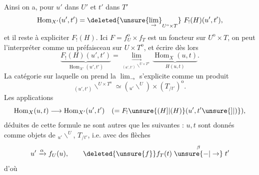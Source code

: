 Ainsi on a, pour $u'$ dans $U'$ et $t'$ dans $T'$
\[
\operatorname{Hom}_{X'}(u',t')=\deleted{\unsure{\lim_{\rightarrow}}_{U^{\mathrm o}\times T}}\ F_!(H)(u',t'),
\]
et il reste à expliciter $F_!(H)$. Ici 
$F=f_U^{\mathrm o}\times f_T$ est un foncteur  sur $U^{\mathrm o}\times T$,
on peut l'interpréter comme un préfaisceau sur
 $U\times T^{\mathrm o}$, et écrire dès lors
\[
\underbrace{F_!(H)(u',t')}_{\operatorname{Hom}_{X'}(u',t')}
=\underset{{}_{(u',t')}\backslash^{U\times T^{\mathrm o}}}{\lim_{\rightarrow}}
\underbrace{\operatorname{Hom}_X(u,t)}_{H(u,t)}.\tag*{(*)}
\]
La catégorie  sur laquelle on prend la $\lim_{\rightarrow}$
s'explicite comme un produit
\[
{}_{(u',t')}\backslash^{U\times T^{\mathrm o}}\simeq
({}_{u'}\backslash^{U})\times(T_{/t'})^{\mathrm o}.
\]
Les applications
\[
\operatorname{Hom}_X(u,t)\longrightarrow\operatorname{Hom}_{X'}(u',t')
\quad(=F_!\unsure{(H]|(H)}(u',t'\unsure{]|)}),
\]
déduites de cette formule ne sont autres que 
les suivantes : $u,t$ sont donnés comme objets de
$\mathord{}_{u'}\backslash^{U}$, $T_{/t'}$, i.e. avec des flèches
\[
u'\xrightarrow{\alpha}f_U(u),\qquad
\deleted{\unsure{f}}f_T(t)\mathrel{\overset{\beta}{\unsure{-|\to}}}t'
\]
d'où


